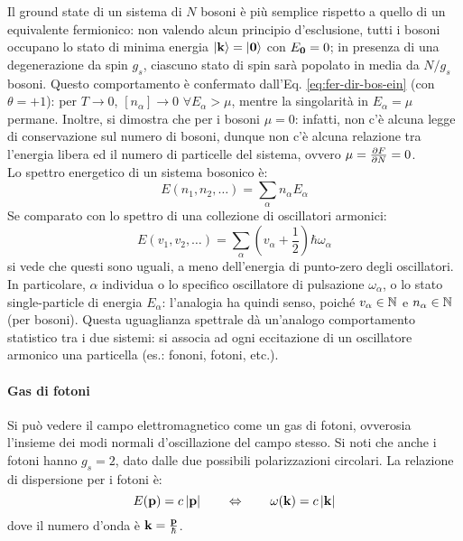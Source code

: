 Il ground state di un sistema di $ N $ bosoni è più semplice rispetto a quello di un equivalente fermionico: non valendo alcun principio d'esclusione, tutti i bosoni occupano lo stato di minima energia $ \ket{\mathbf{k}} = \ket{\mathbf{0}} $ con $ E_{\mathbf{0}} = 0 $; in presenza di una degenerazione da spin $ g_s $, ciascuno stato di spin sarà popolato in media da $ N / g_s $ bosoni. Questo comportamento è confermato dall'Eq. \ref{eq:fer-dir-bos-ein} (con $ \theta = +1 $): per $ T \rightarrow 0 $, $ [n_\alpha] \rightarrow 0 \,\,\forall E_\alpha > \mu $, mentre la singolarità in $ E_\alpha = \mu $ permane. Inoltre, si dimostra che per i bosoni $ \mu = 0 $: infatti, non c'è alcuna legge di conservazione sul numero di bosoni, dunque non c'è alcuna relazione tra l'energia libera ed il numero di particelle del sistema, ovvero $ \mu = \frac{\partial F}{\partial N} = 0 $. \\
Lo spettro energetico di un sistema bosonico è:
\begin{equation}
	E(n_1, n_2, \dots) = \sum_\alpha n_\alpha E_\alpha
\end{equation}
Se comparato con lo spettro di una collezione di oscillatori armonici:
\begin{equation*}
	E(v_1, v_2, \dots) = \sum_\alpha \left( v_\alpha + \frac{1}{2} \right) \hbar \omega_\alpha
\end{equation*}
si vede che questi sono uguali, a meno dell'energia di punto-zero degli oscillatori. In particolare, $ \alpha $ individua o lo specifico oscillatore di pulsazione $ \omega_\alpha $, o lo stato single-particle di energia $ E_\alpha $: l'analogia ha quindi senso, poiché $ v_\alpha \in \mathbb{N} $ e $ n_\alpha \in \mathbb{N} $ (per bosoni). Questa uguaglianza spettrale dà un'analogo comportamento statistico tra i due sistemi: si associa ad ogni eccitazione di un oscillatore armonico una particella (es.: fononi, fotoni, etc.).

\paragraph{Gas di fotoni}

Si può vedere il campo elettromagnetico come un gas di fotoni, ovverosia l'insieme dei modi normali d'oscillazione del campo stesso. Si noti che anche i fotoni hanno $ g_s = 2 $, dato dalle due possibili polarizzazioni circolari. La relazione di dispersione per i fotoni è:
\begin{equation}
	E(\mathbf{p}) = c \left\lvert\mathbf{p}\right\rvert
	\qquad \Leftrightarrow \qquad
	\omega(\mathbf{k}) = c \left\lvert\mathbf{k}\right\rvert
\end{equation}
dove il numero d'onda è $ \mathbf{k} = \frac{\mathbf{p}}{\hbar} $.

